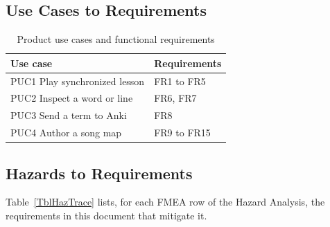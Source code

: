 \documentclass[12pt]{article}
\begin{document}
\subsection{Use Cases to Requirements}
\begin{table}[H]
\caption{Product use cases and functional requirements}
\begin{tabularx}{\textwidth}{lX}
\toprule
\textbf{Use case} & \textbf{Requirements}\\
\midrule
PUC1 Play synchronized lesson & FR1 to FR5\\
PUC2 Inspect a word or line & FR6, FR7\\
PUC3 Send a term to Anki & FR8\\
PUC4 Author a song map & FR9 to FR15\\
\bottomrule
\end{tabularx}
\end{table}

\subsection{Hazards to Requirements}
Table~\ref{TblHazTrace} lists, for each FMEA row of the Hazard Analysis, the
requirements in this document that mitigate it.
\end{document}
